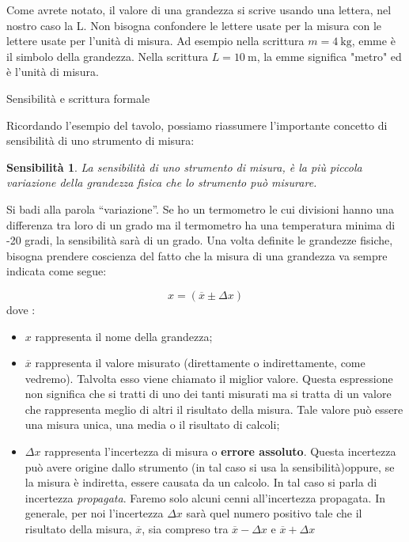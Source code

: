 \documentclass[12pt,a4paper,oneside]{book}
\makeatletter
\newtheorem{sen}{Sensibilità}
\renewcommand{\section}{\@startsection{section}{1}{\z@}
{-4ex \@plus -1ex \@minus -.4ex}
{1ex \@plus.2ex }
{\normalfont\large\sffamily\bfseries}}
\theoremstyle{esercizio}
\makeatother
\begin{document}
Come avrete notato, il valore di una grandezza si scrive usando una lettera, nel nostro caso la L. Non bisogna confondere le lettere usate per la misura con le lettere usate per l'unità di misura. Ad esempio nella scrittura $m=\SI{4}{\kilo\gram}$, emme è il simbolo della grandezza. Nella scrittura $L=\SI{10}{\meter}$, la emme significa "metro" ed è l'unità di misura.

\section{Sensibilità e scrittura formale}

Ricordando l'esempio del tavolo, possiamo riassumere l'importante concetto di sensibilità di uno strumento di misura:

\begin{sen}
	La sensibilità di uno strumento di misura, è la più piccola variazione della grandezza fisica che lo strumento può misurare.
\end{sen}

Si badi alla parola ``variazione''. Se ho un termometro le cui divisioni hanno una differenza tra loro di un grado ma il termometro ha una temperatura minima di -20 gradi, la sensibilità sarà di un grado.
Una volta definite le grandezze fisiche, bisogna prendere coscienza del fatto che la misura di una grandezza va sempre indicata come segue:

\[
x=\left( \overline{x} \pm \Delta x\right)
\]
dove :
\begin{itemize}
\item $x$ rappresenta il nome della grandezza;
\item $\overline{x}$ rappresenta il valore misurato (direttamente o indirettamente, come vedremo). Talvolta esso viene chiamato il miglior valore. Questa espressione non significa che si tratti di uno dei tanti misurati ma si tratta di un valore che rappresenta meglio di altri il risultato della misura. Tale valore può essere una misura unica, una media o il risultato di calcoli;
\item $\Delta x$ rappresenta l'incertezza di misura o \textbf{errore assoluto}. Questa incertezza può avere origine dallo strumento (in tal caso si usa la sensibilità)oppure, se la misura è indiretta, essere causata da un calcolo. In tal caso si parla di incertezza \textit{propagata}. Faremo solo alcuni cenni all'incertezza propagata. In generale, per noi l'incertezza $\Delta x$ sarà quel numero positivo tale che il risultato della misura, $\overline{x}$, sia compreso tra $\overline{x} -\Delta x$ e  $\overline{x} +\Delta x$
\end{itemize}
\end{document}
